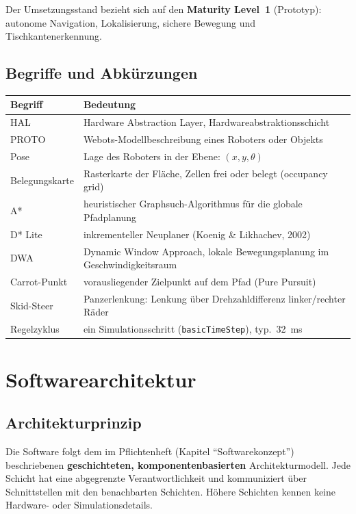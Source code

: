 \documentclass[
  a4paper,
  12pt,
  DIV=12,        %
  parskip=half,  %
  headings=small %
]{scrartcl}
\theoremstyle{definition}
\theoremstyle{definition}
\begin{document}
Der Umsetzungsstand bezieht sich auf den \textbf{Maturity Level~1}
(Prototyp): autonome Navigation, Lokalisierung, sichere Bewegung und
Tischkantenerkennung.

\subsection{Begriffe und Abkürzungen}\label{begriffe-und-abkuerzungen}

\begin{longtable}[]{@{}p{}p{}@{}}
\toprule
\textbf{Begriff} & \textbf{Bedeutung}\\
\midrule
\endhead
HAL & Hardware Abstraction Layer, Hardwareabstraktionsschicht\\
PROTO & Webots-Modellbeschreibung eines Roboters oder Objekts\\
Pose & Lage des Roboters in der Ebene: $(x, y, \theta)$\\
Belegungskarte & Rasterkarte der Fläche, Zellen frei oder belegt (occupancy grid)\\
A* & heuristischer Graphsuch-Algorithmus für die globale Pfadplanung\\
D* Lite & inkrementeller Neuplaner (Koenig \& Likhachev, 2002)\\
DWA & Dynamic Window Approach, lokale Bewegungsplanung im Geschwindigkeitsraum\\
Carrot-Punkt & vorausliegender Zielpunkt auf dem Pfad (Pure Pursuit)\\
Skid-Steer & Panzerlenkung: Lenkung über Drehzahldifferenz linker/rechter Räder\\
Regelzyklus & ein Simulationsschritt (\texttt{basicTimeStep}), typ.\ \SI{32}{\milli\second}\\
\bottomrule
\end{longtable}

\section{Softwarearchitektur}\label{softwarearchitektur}

\subsection{Architekturprinzip}\label{architekturprinzip}

Die Software folgt dem im Pflichtenheft (Kapitel \enquote{Softwarekonzept})
beschriebenen \textbf{geschichteten, komponentenbasierten}
Architekturmodell. Jede Schicht hat eine abgegrenzte
Verantwortlichkeit und kommuniziert über
Schnittstellen mit den benachbarten Schichten. Höhere Schichten kennen
keine Hardware- oder Simulationsdetails.
\end{document}

